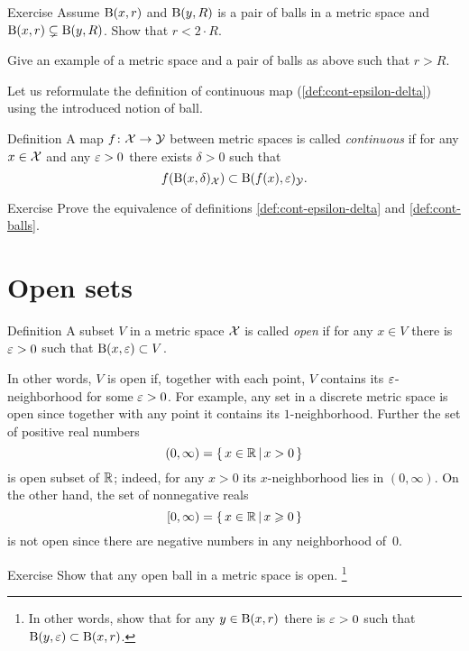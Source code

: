 \begin{thm}{Exercise}\label{ex:r<2R}
Assume $\mathrm{B}(x,r)$  and $\mathrm{B}(y,R)$ is a pair of balls in a metric space 
and $\mathrm{B}(x,r)\subsetneq \mathrm{B}(y,R)$.
Show that $r<2\cdot R$.

Give an example of a metric space and a pair of balls as above such that $r> R$.
\end{thm}

Let us reformulate the definition of continuous map (\ref{def:cont-epsilon-delta}) using the introduced notion of ball.

\begin{thm}{Definition}\label{def:cont-balls}
A map $f\colon\mathcal{X}\to\mathcal{Y}$ between metric spaces is called \emph{continuous} if for any $x\in \mathcal{X}$ and any $\varepsilon>0$ there exists $\delta>0$ such that 
\[f(\mathrm{B}(x,\delta)_{\mathcal{X}})\subset\mathrm{B}(f(x),\varepsilon)_{\mathcal{Y}}.\]

\end{thm}

\begin{thm}{Exercise}\label{ex:def:cont-epsilon-delta=def:cont-balls}
Prove the equivalence of definitions \ref{def:cont-epsilon-delta} and \ref{def:cont-balls}.
\end{thm}



\section{Open sets}

\begin{thm}{Definition}\label{def:open}
A subset $V$ in a metric space $\mathcal{X}$ is called \emph{open} if for any $x\in V$ there is $\varepsilon>0$ such that $\mathrm{B}(x,\varepsilon)\subset V$.
\end{thm}

In other words, $V$ is open if, together with each point, $V$ contains its $\varepsilon$-neighborhood for some $\varepsilon>0$.
For example, any set in a discrete metric space is open since together with any point it contains its $1$-neighborhood.
Further the set of positive real numbers
\[(0,\infty)=\left\{\,{x\in\mathbb{R}}\,\middle|\,{x>0}\,\right\}\] 
is open subset of $\mathbb{R}$; indeed, for any $x>0$ its $x$-neighborhood lies in $(0,\infty)$.
On the other hand, the set of nonnegative reals 
\[[0,\infty)=\left\{\,{x\in\mathbb{R}}\,\middle|\,{x\geqslant0}\,\right\}\]
is not open since there are negative numbers in any neighborhood of~$0$.

\begin{thm}{Exercise}\label{ex:ball-is-open}
Show that any open ball in a metric space is open.%
\footnote{In other words, show that for any $y\in \mathrm{B}(x,r)$ there is $\varepsilon>0$ such that $\Ball(y,\eps)\z\subset\Ball(x,r)$.}
\end{thm}

